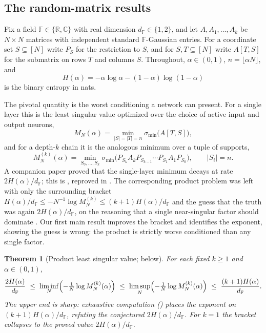 \documentclass[11pt,reqno]{amsart}
\theoremstyle{plain}
\newtheorem{theorem}{Theorem}[section]
\theoremstyle{definition}
\theoremstyle{remark}
\newcommand{\R}{\mathbb{R}}
\newcommand{\C}{\mathbb{C}}
\newcommand{\F}{\mathbb{F}}
\newcommand{\smin}{\sigma_{\min}}
\newcommand{\dF}{d_{\F}}
\begin{document}
\subsection{The random-matrix results}
Fix a field $\F\in\{\R,\C\}$ with real dimension $\dF\in\{1,2\}$, and let $A,A_1,\dots,A_k$ be
$N\times N$ matrices with independent standard $\F$-Gaussian entries. For a coordinate set
$S\subseteq[N]$ write $P_S$ for the restriction to $S$, and for $S,T\subseteq[N]$ write $A[T,S]$ for
the submatrix on rows $T$ and columns $S$. Throughout, $\alpha\in(0,1)$, $n=\lfloor\alpha N\rfloor$,
and
\[
  H(\alpha)=-\alpha\log\alpha-(1-\alpha)\log(1-\alpha)
\]
is the binary entropy in nats.

The pivotal quantity is the worst conditioning a network can present. For a single layer this is the
least singular value optimized over the choice of active input and output neurons,
\[
  M_N(\alpha)=\min_{|S|=|T|=n}\smin\bigl(A[T,S]\bigr),
\]
and for a depth-$k$ chain it is the analogous minimum over a tuple of supports,
\[
  M_N^{(k)}(\alpha)=\min_{S_0,\dots,S_k}\smin\bigl(P_{S_k}A_kP_{S_{k-1}}\cdots P_{S_1}A_1P_{S_0}\bigr),
  \qquad |S_i|=n.
\]
A companion paper \cite{shmaloSharp} proved that the single-layer minimum decays at rate
$2H(\alpha)/\dF$; this is , reproved in . The corresponding
product problem was left with only the surrounding bracket
$H(\alpha)/\dF\le -N^{-1}\log M_N^{(k)}\le(k+1)H(\alpha)/\dF$ and the guess that the truth was again
$2H(\alpha)/\dF$, on the reasoning that a single near-singular factor should dominate
\cite{shmaloProducts}. Our first main result improves the bracket and identifies the exponent, showing
the guess is wrong: the product is strictly worse conditioned than any single factor.

\begin{theorem}[Product least singular value;  below]\label{thm:intro-product}
For each fixed $k\ge1$ and $\alpha\in(0,1)$,
\[
  \frac{2H(\alpha)}{\dF}\ \le\ \liminf_N\Bigl(-\tfrac1N\log M_N^{(k)}(\alpha)\Bigr)\ \le\
  \limsup_N\Bigl(-\tfrac1N\log M_N^{(k)}(\alpha)\Bigr)\ \le\ \frac{(k+1)H(\alpha)}{\dF}.
\]
The upper end is sharp: exhaustive computation () places the exponent on
$(k+1)H(\alpha)/\dF$, refuting the conjectured $2H(\alpha)/\dF$. For $k=1$ the bracket collapses to the
proved value $2H(\alpha)/\dF$.
\end{theorem}
\end{document}
